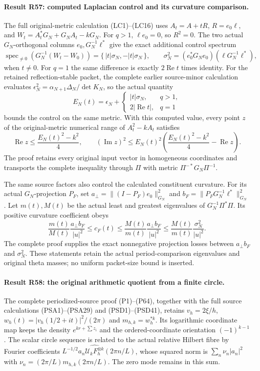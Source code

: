 \paragraph{Result R57: computed Laplacian control and its curvature comparison.}
The full original-metric calculation (LC1)--(LC16) uses
\(A_t=A+tR\), \(R=e_0\ell\), and
\(W_t=A_t^*G_N+G_NA_t-kG_N\).
For \(q>1\), \(\ell e_0=0\), so \(R^2=0\). The two actual
\(G_N\)-orthogonal columns \(e_0,G_N^{-1}\ell^*\) give
the exact additional control spectrum
\[
 \operatorname{spec}_{\ne0}
     (G_N^{-1}(W_t-W_0))
       =\{\,|t|\sigma_N,-|t|\sigma_N\,\},\qquad
 \sigma_N^2=(e_0^*G_Ne_0)(\ell G_N^{-1}\ell^*),
\]
when \(t\ne0\). For \(q=1\) the same difference is exactly
\(2\operatorname{Re}t\) times identity. For the retained
reflection-stable packet, the complete earlier source-minor calculation evaluates
\(\epsilon_N^2=\alpha_{N+1}\Delta_N/\det K_N\), so the actual
quantity
\[
 E_N(t)=\epsilon_N+
 \begin{cases}|t|\sigma_N,&q>1,\\
               2|\operatorname{Re}t|,&q=1
 \end{cases}
\]
bounds the control on the same metric. With this computed value,
every point \(z\) of the original-metric numerical range of
\(A_t^2-kA_t\) satisfies
\[
 \operatorname{Re}z\le\frac{E_N(t)^2-k^2}{4},\qquad
 (\operatorname{Im}z)^2\le E_N(t)^2
   \left(\frac{E_N(t)^2-k^2}{4}-\operatorname{Re}z\right).
\]
The proof retains every original input vector in homogeneous
coordinates and transports the complete inequality through
\(\Pi\) with metric \(\Pi^{-*}G_N\Pi^{-1}\).

The same source factors also control the calculated constituent
curvature. For its actual \(G_N\)-projection \(P_F\), set
\(a_\perp=\|(I-P_F)e_0\|_{G_N}^2\) and
\(b_F=\|P_FG_N^{-1}\ell^*\|_{G_N}^2\).
Let \(m(t),M(t)\) be the actual least and greatest eigenvalues of
\(G_N^{-1}\Pi^*\Pi\). Its positive curvature coefficient obeys
\[
 \frac{m(t)}{M(t)}\frac{a_\perp b_F}{|u|^2}
 \le c_F(t)\le
 \frac{M(t)}{m(t)}\frac{a_\perp b_F}{|u|^2}
 \le\frac{M(t)}{m(t)}\frac{\sigma_N^2}{|u|^2}.
\]
The complete proof supplies the exact nonnegative projection losses
between \(a_\perp b_F\) and \(\sigma_N^2\). These statements
retain the actual period-comparison eigenvalues and original theta
masses; no uniform packet-size bound is inserted.


\paragraph{Result R58: the original arithmetic quotient from a finite circle.}
The complete periodized-source proof (P1)--(P64), together with the
full source calculations (PSA1)--(PSA29) and (PSD1)--(PSD41), retains
$v_h=2\xi/h$, $w_h(t)=|v_h(1/2+it)|^2/(2\pi)$ and
$m_{h,k}=w_h^{*k}$. Its logarithmic coordinate map keeps the density
$e^{kr+\sum z_i}$ and the ordered-coordinate orientation
$(-1)^{k-1}$. The scalar circle sequence is related to the actual
relative Hilbert fibre by Fourier coefficients
$L^{-1/2}a_n\widehat{\mathcal U_kF_h^{\otimes k}}(2\pi n/L)$,
whose squared norm is $\sum_n\nu_n|a_n|^2$ with
$\nu_n=(2\pi/L)m_{h,k}(2\pi n/L)$. The zero mode remains in this sum.

